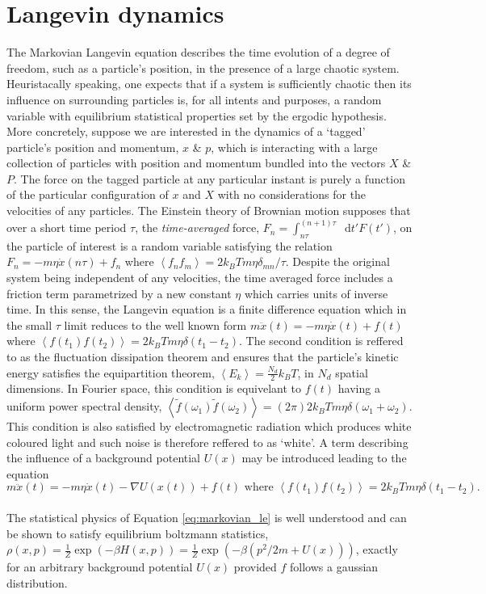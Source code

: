 \documentclass{article}
\newcommand*{\diff}{\mathop{}\!\mathrm{d}}
\begin{document}
\section{Langevin dynamics}

The Markovian Langevin equation describes the time evolution of a degree of freedom, such as a particle's position, in the presence of a large chaotic system. Heuristacally speaking, one expects that if a system is sufficiently chaotic then its influence on surrounding particles is, for all intents and purposes, a random variable with equilibrium statistical properties set by the ergodic hypothesis. More concretely, suppose we are interested in the dynamics of a `tagged' particle's position and momentum, $x$ \& $p$, which is interacting with a large collection of particles with position and momentum bundled into the vectors $X$ \& $P$. The force on the tagged particle at any particular instant is purely a function of the particular configuration of $x$ and $X$ with no considerations for the velocities of any particles. The Einstein theory of Brownian motion supposes that over a short time period $\tau$, the \emph{time-averaged} force, $F_n = \int_{n\tau}^{(n+1)\tau}\diff{t'}F(t')$, on the particle of interest is a random variable satisfying the relation $F_n=-m\eta\dot{x}(n\tau) + f_n$ where $\left<f_nf_m\right> = 2k_BTm\eta\delta_{mn}/\tau$. Despite the original system being independent of any velocities, the time averaged force includes a friction term parametrized by a new constant $\eta$ which carries units of inverse time. In this sense, the Langevin equation is a finite difference equation which in the small $\tau$ limit reduces to the well known form $m\ddot{x}(t)=-m\eta\dot{x}(t)+f(t)$ where $\left<f(t_1)f(t_2)\right>=2k_BTm\eta\delta(t_1 - t_2)$. The second condition is reffered to as the fluctuation dissipation theorem and ensures that the particle's kinetic energy satisfies the equipartition theorem, $\left<E_k\right>=\frac{N_d}{2}k_BT$, in $N_d$ spatial dimensions. In Fourier space, this condition is equivelant to $f(t)$ having a uniform power spectral density, $\left<\tilde{f}(\omega_1)\tilde{f}(\omega_2)\right> = (2\pi) 2 k_B T m \eta \delta(\omega_1 + \omega_2)$. This condition is also satisfied by electromagnetic radiation which produces white coloured light and such noise is therefore reffered to as `white'. A term describing the influence of a background potential $U(x)$ may be introduced leading to the equation
\\
\begin{equation}
	\label{eq:markovian_le}
	m\ddot{x}(t)=-m\eta\dot{x}(t) - \nabla U(x(t)) + f(t) \text{ where } \left<f(t_1)f(t_2)\right>=2k_BTm\eta\delta(t_1 - t_2).
\end{equation}
\\
The statistical physics of Equation \ref{eq:markovian_le} is well understood and can be shown to satisfy equilibrium boltzmann statistics, $\rho(x, p)=\frac{1}{Z}\exp(-\beta H(x, p))=\frac{1}{Z}\exp(-\beta(p^2/2m + U(x)))$, exactly for an arbitrary background potential $U(x)$ provided $f$ follows a gaussian distribution.
\end{document}
